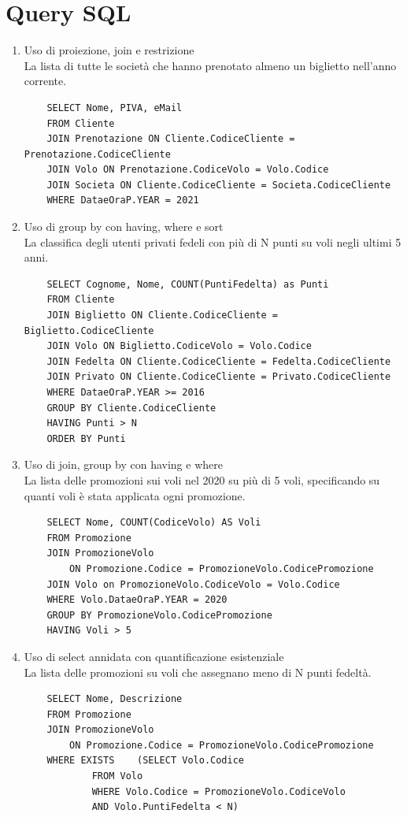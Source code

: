 \documentclass[10pt]{article}
\begin{document}
\section{Query SQL}
\begin{enumerate}
	\item Uso di proiezione, join e restrizione\\
	La lista di tutte le società che hanno prenotato almeno un biglietto nell'anno corrente.
	\begin{lstlisting}
	SELECT Nome, PIVA, eMail
	FROM Cliente
	JOIN Prenotazione ON Cliente.CodiceCliente = Prenotazione.CodiceCliente
	JOIN Volo ON Prenotazione.CodiceVolo = Volo.Codice
	JOIN Societa ON Cliente.CodiceCliente = Societa.CodiceCliente
	WHERE DataeOraP.YEAR = 2021
	\end{lstlisting}
	\item Uso di group by con having, where e sort\\
	La classifica degli utenti privati fedeli con più di N punti su voli negli ultimi 5 anni.
	\begin{lstlisting}
	SELECT Cognome, Nome, COUNT(PuntiFedelta) as Punti
	FROM Cliente
	JOIN Biglietto ON Cliente.CodiceCliente = Biglietto.CodiceCliente
	JOIN Volo ON Biglietto.CodiceVolo = Volo.Codice
	JOIN Fedelta ON Cliente.CodiceCliente = Fedelta.CodiceCliente
	JOIN Privato ON Cliente.CodiceCliente = Privato.CodiceCliente
	WHERE DataeOraP.YEAR >= 2016
	GROUP BY Cliente.CodiceCliente
	HAVING Punti > N
	ORDER BY Punti
	\end{lstlisting}
	\item Uso di join, group by con having e where\\
	La lista delle promozioni sui voli nel 2020 su più di 5 voli, specificando su quanti voli è stata applicata ogni promozione.
	\begin{lstlisting}
	SELECT Nome, COUNT(CodiceVolo) AS Voli
	FROM Promozione
	JOIN PromozioneVolo
		ON Promozione.Codice = PromozioneVolo.CodicePromozione
	JOIN Volo on PromozioneVolo.CodiceVolo = Volo.Codice
	WHERE Volo.DataeOraP.YEAR = 2020
	GROUP BY PromozioneVolo.CodicePromozione
	HAVING Voli > 5
	\end{lstlisting}
	\item Uso di select annidata con quantificazione esistenziale\\La lista delle promozioni su voli che assegnano meno di N punti fedeltà.
	\begin{lstlisting}
	SELECT Nome, Descrizione
	FROM Promozione
	JOIN PromozioneVolo
		ON Promozione.Codice = PromozioneVolo.CodicePromozione
	WHERE EXISTS	(SELECT Volo.Codice
			FROM Volo
			WHERE Volo.Codice = PromozioneVolo.CodiceVolo
			AND Volo.PuntiFedelta < N)
	\end{lstlisting}
	

\end{enumerate}
\end{document}

